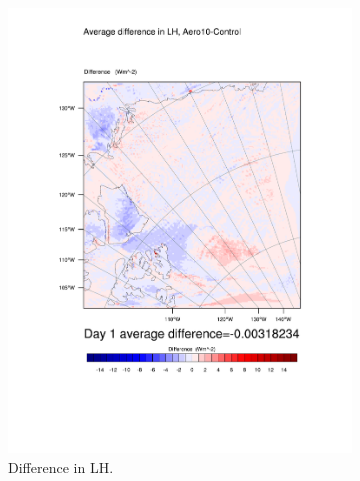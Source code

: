\begin{figure}
\centering
	\begin{subfigure}{0.48\textwidth}
		\includegraphics[width=\textwidth]{results/aero10/diff_Aero10_LH_Day1.pdf}
		\caption{Difference in LH.}
		\label{subfig:lh_r3Day1}
	\end{subfigure}
	\quad
	\begin{subfigure}{0.48\textwidth}

\end{subfigure}
\end{figure}
